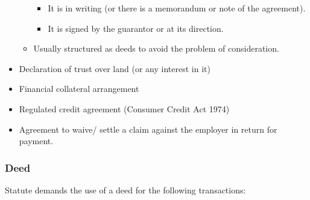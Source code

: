 \documentclass[
]{article}
\providecommand{\tightlist}{%
  \setlength{\itemsep}{0pt}\setlength{\parskip}{0pt}}
\begin{document}
\begin{itemize}
\begin{itemize}
    \begin{itemize}
    \tightlist
    \item
      It is in writing (or there is a memorandum or note of the
      agreement).
    \item
      It is signed by the guarantor or at its direction.
    \end{itemize}
  \item
    Usually structured as deeds to avoid the problem of consideration.
  \end{itemize}
\item
  Declaration of trust over land (or any interest in it)
\item
  Financial collateral arrangement
\item
  Regulated credit agreement (Consumer Credit Act 1974)
\item
  Agreement to waive/ settle a claim against the employer in return for
  payment.
\end{itemize}

\hypertarget{deed}{%
\subsubsection{Deed}\label{deed}}

Statute demands the use of a deed for the following transactions:
\end{document}
